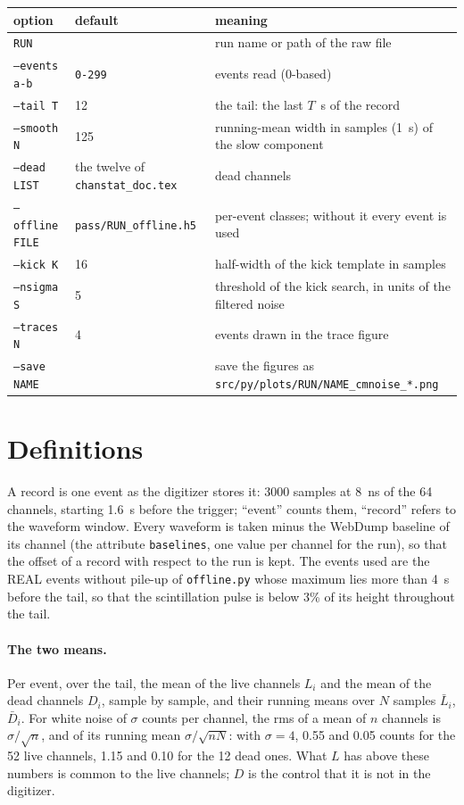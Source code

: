 \documentclass[11pt]{article}
\newcommand{\code}[1]{\texttt{#1}}
\newcommand{\us}{\textmu s}
\begin{document}
\begin{center}
\begin{tabular}{l l p{80mm}}
\toprule
option & default & meaning \\
\midrule
\code{RUN} & & run name or path of the raw file \\
\code{--events a-b} & \code{0-299} & events read (0-based) \\
\code{--tail T} & 12 & the tail: the last $T$~\us{} of the record \\
\code{--smooth N} & 125 & running-mean width in samples (1~\us) of the slow component \\
\code{--dead LIST} & the twelve of \code{chanstat\_doc.tex} & dead channels \\
\code{--offline FILE} & \code{pass/RUN\_offline.h5} & per-event classes; without it every event is used \\
\code{--kick K} & 16 & half-width of the kick template in samples \\
\code{--nsigma S} & 5 & threshold of the kick search, in units of the filtered noise \\
\code{--traces N} & 4 & events drawn in the trace figure \\
\code{--save NAME} & & save the figures as \code{src/py/plots/RUN/NAME\_cmnoise\_*.png} \\
\bottomrule
\end{tabular}
\end{center}

\section{Definitions}

A record is one event as the digitizer stores it: 3000 samples at 8~ns of
the 64 channels, starting 1.6~\us{} before the trigger; ``event'' counts
them, ``record'' refers to the waveform window. Every waveform is taken minus the WebDump baseline of its channel (the
attribute \code{baselines}, one value per channel for the run), so that
the offset of a record with respect to the run is kept. The events used
are the REAL events without pile-up of \code{offline.py} whose maximum
lies more than 4~\us{} before the tail, so that the scintillation pulse
is below 3\% of its height throughout the tail.

\paragraph{The two means.} Per event, over the tail, the mean of the live
channels $L_i$ and the mean of the dead channels $D_i$, sample by sample,
and their running means over $N$ samples $\bar L_i$, $\bar D_i$. For white
noise of $\sigma$ counts per channel, the rms of a mean of $n$ channels is
$\sigma/\sqrt n$, and of its running mean $\sigma/\sqrt{nN}$: with
$\sigma = 4$, 0.55 and 0.05 counts for the 52 live channels, 1.15 and
0.10 for the 12 dead ones. What $L$ has above these numbers is common to
the live channels; $D$ is the control that it is not in the digitizer.
\end{document}
